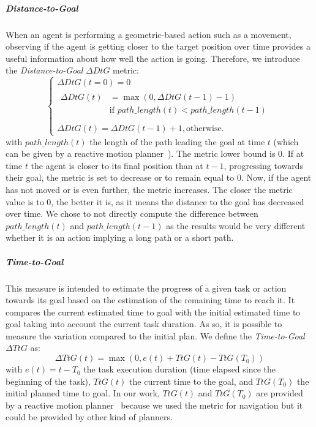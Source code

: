 \documentclass[a4paper,11pt,twoside]{StyleThese}
\begin{document}
\subparagraph{Distance-to-Goal}\label{para:dtg_gd} 
When an agent is performing a geometric-based action such as a movement, observing if the agent is getting closer to the target position over time provides a useful information about how well the action is going. Therefore, we introduce the \textit{Distance-to-Goal} $\Delta DtG$ metric: 
\begin{equation}\label{eq:dtgg}
\left\{
\begin{array}{ll}
\Delta DtG(t=0) = 0\\
\begin{aligned}
\Delta DtG(t) &= \max(0,\Delta DtG(t-1) - 1)  \\&\text{if } path\_length(t) <  path\_length(t-1) \\

\end{aligned}\\
\Delta DtG(t)= \Delta DtG(t-1) + 1, \text{otherwise.}

\end{array}
\right.
\end{equation}
with $path\_length(t)$ the length of the path leading the goal at time $t$ (\eg which can be given by a reactive motion planner~\cite{khamb2019}). The metric lower bound is 0. If at time $t$ the agent is closer to its final position than at $t-1$, \ie progressing towards their goal, the metric is set to decrease or to remain equal to 0. Now, if the agent has not moved or is even further, the metric increases. The closer the metric value is to 0, the better it is, as it means the distance to the goal has decreased over time. We chose to not directly compute the difference between  $path\_length(t)$ and  $path\_length(t-1)$ as the results would be very different whether it is an action implying a long path or a short path. 

\subparagraph{Time-to-Goal}\label{para:dtg_t}
This measure is intended to estimate the progress of a given task or action towards its goal based on the estimation of the remaining time to reach it. It compares the current estimated time to goal with the initial estimated time to goal taking into account the current task duration. As so, it is possible to measure the variation compared to the initial plan. We define the \textit{Time-to-Goal} $\Delta TtG$ as:
\begin{equation}\label{eq:ttg}
\Delta TtG(t) = \max(0, e(t)  + TtG(t) - TtG(T_0))
\end{equation}
with $e(t) = t - T_0$ the task execution duration (time elapsed since the beginning of the task), $TtG(t)$ the current time to the goal, and $TtG(T_0)$ the initial planned time to goal. In our work, $TtG(t)$ and $TtG(T_0)$ are provided by a reactive motion planner~\cite{khamb2019} because we used the metric for navigation but it could be provided by other kind of planners. 
\end{document}
